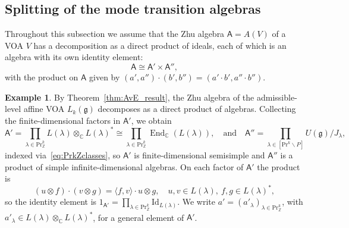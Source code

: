 \documentclass[12pt,a4paper,reqno]{amsart}
\numberwithin{equation}{section}
\theoremstyle{definition}
\newtheorem{example}[theorem]{Example}
\newcommand{\g}{\mathfrak{g}}
\newcommand{\End}{\operatorname{End}}
\newcommand{\C}{\mathbb{C}}
\newcommand{\Z}{\mathbb{Z}}
\def\Pr{\mathrm{Pr}}
\def\la{\lambda}
\def\bs{\backslash}
\def\o{\otimes}
\def\<{\langle}
\def\>{\rangle}
\def\Id{\mathrm{Id}}
\def\A{\mathsf{A}}
\begin{document}
\subsection{Splitting of the mode transition algebras}

Throughout this subsection we assume that the Zhu algebra $\A=A(V)$ of a VOA $V$ has a decomposition as a direct product of ideals, each of which is an algebra with its own identity element:
\begin{equation}
    \A \cong \A' \times \A'',
\end{equation}
with the product on $\A$ given by $(a',a'')\cdot(b',b'')=(a'\cdot b',a''\cdot b'')$. %
\begin{example}\label{ex:Aadm}
By Theorem~\ref{thm:AvE_result}, the Zhu algebra of the admissible-level affine VOA $L_k(\g)$ decomposes as a direct product of algebras. Collecting the finite-dimensional factors in $\A'$, we obtain
\begin{equation}\label{eq:Aadm}
    \A'=\prod_{\la\in \Pr^k_\Z} L(\la)\otimes_\C L(\la)^\ast\cong \prod_{\la\in \Pr^k_\Z}\End_\C(L(\la)),\quad \text{and}\quad \A''=\prod_{\la\in [\Pr^k\bs P]} U(\g)/J_{\la},
\end{equation}
indexed via~\eqref{eq:PrkZclasses}, so $\A'$ is finite-dimensional semisimple and $\A''$ is a product of simple infinite-dimensional algebras. On each factor of $\A'$ the product is
\begin{equation}\label{eq:alambda}
(u\o f)\cdot (v\o g)=\<f,v\>\cdot u\o g,\quad u,v\in L(\la),\ f,g\in L(\la)^\ast,
\end{equation}
so the identity element is $1_{\A'}=\prod_{\la\in \Pr^k_\Z} \Id_{L(\la)}$. We write $a'=(a'_\la)_{\la\in \Pr^k_\Z}$, with $a'_\la\in L(\la)\o_\C L(\la)^\ast$, for a general element of $\A'$.
\end{example}
\end{document}
